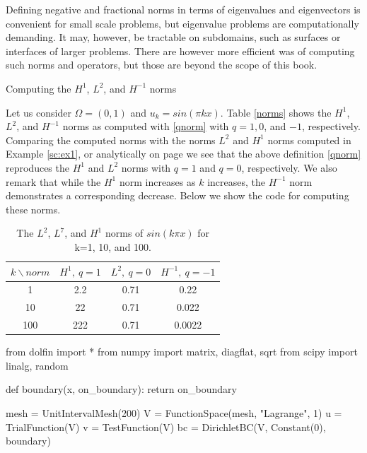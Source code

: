 Defining negative and fractional norms in terms of eigenvalues and eigenvectors 
is convenient for small scale problems, but eigenvalue problems are computationally
demanding. It may, however, be tractable on subdomains, such as surfaces or interfaces 
of larger problems. There are however more    
efficient was of computing such norms and operators, but those are beyond the scope of this
book. 


\begin{example}{Computing the $H^1$, $L^2$, and $H^{-1}$ norms} \label{sc:ex2} 

Let us consider $\Omega = (0,1)$ and $u_k = sin(\pi k x)$.  
Table \ref{norms} shows the $H^1$, $L^2$, and $H^{-1}$ norms as computed
with \eqref{qnorm} with $q=1, 0$, and $-1$, respectively.  Comparing 
the computed norms with the norms $L^2$ and $H^1$ norms  computed
in Example \ref{sc:ex1}, or analytically on page \pageref{sinkpnorms}  we see that the above definition \eqref{qnorm}
reproduces the $H^1$ and $L^2$ norms with $q=1$ and $q=0$, respectively.     
We also remark that while the $H^1$ norm increases as
$k$ increases, the  $H^{-1}$ norm demonstrates a corresponding decrease.  
Below we show the code for computing these norms. 


\begin{table}[h]
\begin{center}
\begin{tabular}{|c|c|c|c|}  \hline
$k \backslash norm $ & $H^1, \ q=1  $ &   $L^2, \ q=0$ &  $H^{-1}, \ q=-1$ \\ \hline
1 &  2.2 &    0.71  &  0.22      \\ \hline
10  & 22 &    0.71   & 0.022   \\ \hline
100  & 222 &   0.71  & 0.0022   \\ \hline
\end{tabular}
\caption{ The $L^2$, $L^7$, and $H^1$ norms of $sin(k \pi x)$ for k=1, 10, and 100.   }
\label{table:norms}
\end{center}
\end{table}


\begin{python}
from dolfin import *
from numpy import matrix, diagflat, sqrt
from scipy import linalg, random 

def boundary(x, on_boundary): return on_boundary

mesh = UnitIntervalMesh(200)
V = FunctionSpace(mesh, "Lagrange", 1)
u = TrialFunction(V)
v = TestFunction(V)
bc = DirichletBC(V, Constant(0), boundary)


\end{python}
\end{example}
